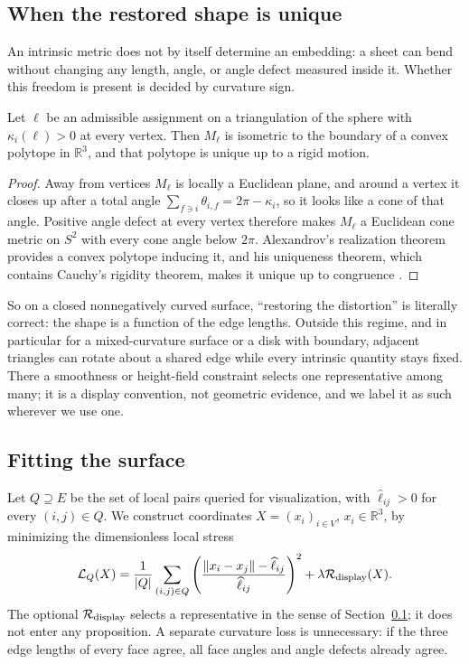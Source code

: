 \subsection{When the restored shape is unique}
\label{sec:rigidity}

An intrinsic metric does not by itself determine an embedding: a sheet can
bend without changing any length, angle, or angle defect measured inside it.
Whether this freedom is present is decided by curvature sign.

\begin{proposition}
\label{prop:rigidity}
Let $\ell$ be an admissible assignment on a triangulation of the sphere with
$\kappa_i(\ell)>0$ at every vertex.  Then $M_\ell$ is isometric to the
boundary of a convex polytope in $\mathbb R^3$, and that polytope is unique up
to a rigid motion.
\end{proposition}

\begin{proof}
Away from vertices $M_\ell$ is locally a Euclidean plane, and around a vertex
it closes up after a total angle $\sum_{f\ni i}\theta_{i,f}=2\pi-\kappa_i$, so
it looks like a cone of that angle.  Positive angle defect at every vertex
therefore makes $M_\ell$ a Euclidean cone metric on $S^2$ with every cone
angle below $2\pi$.  Alexandrov's realization theorem
provides a convex polytope inducing it, and his uniqueness theorem, which
contains Cauchy's rigidity theorem, makes it unique up to congruence
\cite{alexandrov2005,pak2010}.
\end{proof}

So on a closed nonnegatively curved surface, ``restoring the distortion'' is
literally correct: the shape is a function of the edge lengths.  Outside this
regime, and in particular for a
mixed-curvature surface or a disk with boundary, adjacent triangles can rotate
about a shared edge while every intrinsic quantity stays fixed.  There a
smoothness or height-field constraint selects one representative among many;
it is a display convention, not geometric evidence, and we label it as such
wherever we use one.

\subsection{Fitting the surface}

Let $Q\supseteq E$ be the set of local pairs queried for visualization, with
$\widehat\ell_{ij}>0$ for every $(i,j)\in Q$.  We construct coordinates
$X=(x_i)_{i\in V}$, $x_i\in\mathbb R^3$, by minimizing the dimensionless local
stress
\begin{equation}
 \mathcal L_Q(X)
 =\frac1{|Q|}\sum_{(i,j)\in Q}
 \left(
  \frac{\lVert x_i-x_j\rVert-\widehat\ell_{ij}}
  {\widehat\ell_{ij}}
 \right)^2
 +\lambda\mathcal R_{\rm display}(X).
 \label{eq:display-objective}
\end{equation}
The optional $\mathcal R_{\rm display}$ selects a representative in the sense
of Section~\ref{sec:rigidity}; it does not enter any proposition.  A separate
curvature loss is unnecessary: if the three edge lengths of every face agree,
all face angles and angle defects already agree.

